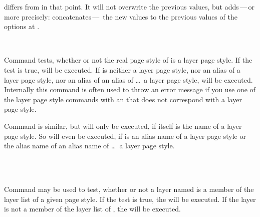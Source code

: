  differs from
 in that point. It will not overwrite the
previous values, but adds\,---\,or more precisely: concatenates\,---\, the new
values to the previous values of the options at .%
%
%

\begin{Declaration}
  \\
\end{Declaration}
%
%
Command  tests, whether or not the real page
style of  is a layer page style. If the test is true,
 will be executed. If  is neither a
layer page style, nor an alias of a layer page style, nor an alias of an alias
of \dots\ a layer page style,  will be executed. Internally
this command is often used to throw an error message if you use one of the
layer page style commands with an  that does not
correspond with a layer page style.

Command  is similar, but 
will only be executed, if  itself is the name of a
layer page style. So  will even be executed, if  is an alias name of a layer page style or the alias name of an
alias name of \dots\ a layer page style.%
%
%

\begin{Declaration}
  \\
  \\
\end{Declaration}
%
%
%
Command  may be used to test, whether or not a layer
named  is a member of the layer list of a given page
style. If the test is true, the  will be executed. If the
layer is not a member of the layer list of , the
 will be executed.

